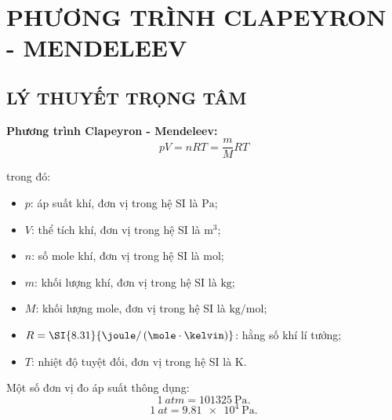 \section{PHƯƠNG TRÌNH CLAPEYRON - MENDELEEV}
\subsection{LÝ THUYẾT TRỌNG TÂM}
\begin{boxdl}
	\textbf{Phương trình Clapeyron - Mendeleev:}
	$$pV=n RT=\dfrac{m}{M}RT$$
\end{boxdl}
trong đó:
\begin{itemize}
	\item $p$: áp suất khí, đơn vị trong hệ SI là $\si{\pascal}$;
	\item $V$: thể tích khí, đơn vị trong hệ SI là $\si{\meter^3}$;
	\item $n$: số mole khí, đơn vị trong hệ SI là $\si{\mole}$;
	\item $m$: khối lượng khí, đơn vị trong hệ SI là $\si{\kilo\gram}$;
	\item $M$: khối lượng mole, đơn vị trong hệ SI là $\si{\kilo\gram/\mole}$;
	\item $R=\SI{8.31}{\joule/\left(\mole\cdot\kelvin\right)}$: hằng số khí lí tưởng;
	\item $T$: nhiệt độ tuyệt đối, đơn vị trong hệ SI là $\si{\kelvin}$.
	
\end{itemize}
\begin{luuy}
	Một số đơn vị đo áp suất thông dụng:
	$$\SI{1}{atm}=\SI{101325}{\pascal}.$$
	$$\SI{1}{at}=\SI{9.81e4}{\pascal}.$$
\end{luuy}

